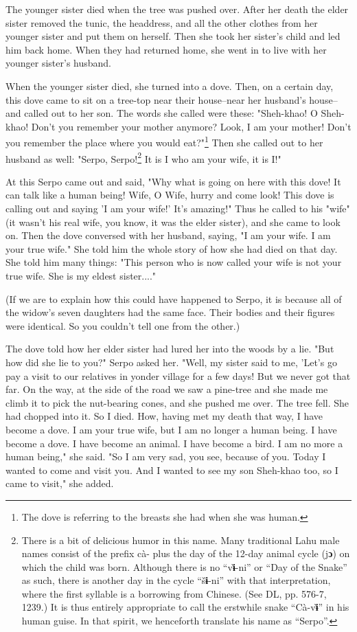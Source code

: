 The younger sister died when the tree was pushed over. After her death the elder
sister removed the tunic, the headdress, and all the other clothes from her younger
sister and put them on herself. Then she took her sister's child and led him back
home. When they had returned home, she went in to live with her younger sister's
husband.

When the younger sister died, she turned into a dove. Then, on a certain day, this
dove came to sit on a tree-top near their house--near her husband's house--and
called out to her son. The words she called were these: "Sheh-khao! O
Sheh-khao! Don't you remember your mother anymore? Look, I am your mother! Don't
you remember the place where you would eat?"\footnote{The dove is referring to the breasts she had when she was human.} Then she called out to
her husband as well: "Serpo, Serpo!\footnote{There is a bit of delicious humor in this name. Many traditional Lahu male names consist of the prefix cà- plus the day of the 12-day animal cycle (j\textbf{ɔ}) on which the child was born. Although there is no ``v\textbf{ɨ}̀-ni'' or ``Day of the Snake'' as such, there is another day in the cycle ``š\textbf{ɨ}̄-ni'' with that interpretation, where the first syllable is a borrowing from Chinese. (See DL, pp. 576-7, 1239.) It is thus entirely appropriate to call the erstwhile snake ``Cà-v\textbf{ɨ}̀'' in his human guise. In that spirit, we henceforth translate his name as ``Serpo''.} It is I who am your wife, it is
I!"

At this Serpo came out and said, "Why what is going on here with this
dove! It can talk like a human being! Wife, O Wife, hurry and come look! This dove
is calling out and saying 'I am your wife!' It's amazing!" Thus he called
to his "wife" (it wasn't his real wife, you know, it was the
elder sister), and she came to look on. Then the dove conversed with her husband,
saying, "I am your wife. I am your true wife." She told him the
whole story of how she had died on that day. She told him many things: "This
person who is now called your wife is not your true wife. She is my eldest sister...."

(If we are to explain how this could have happened to Serpo, it is because all
of the widow's seven daughters had the same face. Their bodies and their figures
were identical. So you couldn't tell one from the other.)

The dove told how her elder sister had lured her into the woods by a lie. "But
how did she lie to you?" Serpo asked her. "Well, my sister said
to me, 'Let's go pay a visit to our relatives in yonder village for a few days!
But we never got that far. On the way, at the side of the road we saw a pine-tree
and she made me climb it to pick the nut-bearing cones, and she pushed me over.
The tree fell. She had chopped into it. So I died. How, having met my death that
way, I have become a dove. I am your true wife, but I am no longer a human being.
I have become a dove. I have become an animal. I have become a bird. I am no more
a human being," she said. "So I am very sad, you see, because
of you. Today I wanted to come and visit you. And I wanted to see my son Sheh-khao
too, so I came to visit," she added.

